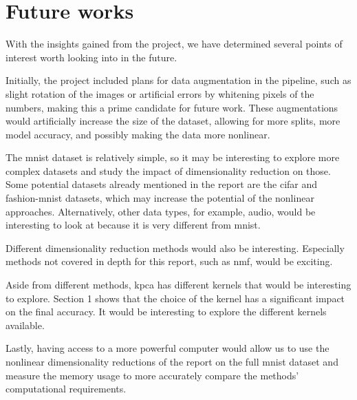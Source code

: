 \chapter{Future works}\label{sec:future-works}
With the insights gained from the project, we have determined several points of interest worth looking into in the future.

Initially, the project included plans for data augmentation in the pipeline, such as slight rotation of the images or artificial errors by whitening pixels of the numbers, making this a prime candidate for future work. These augmentations would artificially increase the size of the dataset, allowing for more splits, more model accuracy, and possibly making the data more nonlinear.

The \gls{mnist} dataset is relatively simple, so it may be interesting to explore more complex datasets and study the impact of dimensionality reduction on those. Some potential datasets already mentioned in the report are the \gls{cifar} and \gls{fashion-mnist} datasets, which may increase the potential of the nonlinear approaches. Alternatively, other data types, for example, audio, would be interesting to look at because it is very different from \gls{mnist}.

Different dimensionality reduction methods would also be interesting. Especially methods not covered in depth for this report, such as \gls{nmf}, would be exciting.

Aside from different methods, \gls{kpca} has different kernels that would be interesting to explore. Section 1 shows that the choice of the kernel has a significant impact on the final accuracy. It would be interesting to explore the different kernels available.

Lastly, having access to a more powerful computer would allow us to use the nonlinear dimensionality reductions of the report on the full \gls{mnist} dataset and measure the memory usage to more accurately compare the methods' computational requirements.
